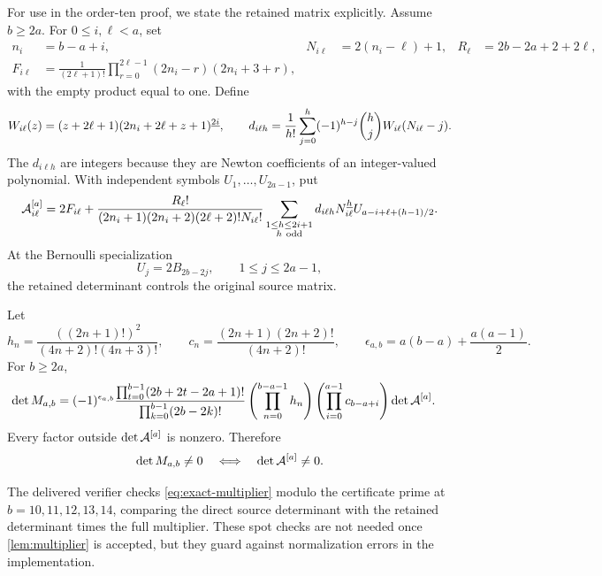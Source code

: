 For use in the order-ten proof, we state the retained matrix explicitly.
Assume $b\ge2a$.  For $0\le i,\ell<a$, set
\begin{align}
 n_i&=b-a+i,&
 N_{i\ell}&=2(n_i-\ell)+1,&
 R_\ell&=2b-2a+2+2\ell,\label{eq:retained-indices}\\
 F_{i\ell}&=\frac1{(2\ell+1)!}
 \prod_{r=0}^{2\ell-1}(2n_i-r)(2n_i+3+r),
 \label{eq:F-entry}
\end{align}
with the empty product equal to one.  Define
\begin{equation}
 W_{i\ell}(z)=(z+2\ell+1)
              (2n_i+2\ell+z+1)^{\underline{2i}},
 \qquad
 d_{i\ell h}=\frac1{h!}\sum_{j=0}^h
 (-1)^{h-j}\binom hjW_{i\ell}(N_{i\ell}-j).
 \label{eq:d-finite-difference}
\end{equation}
The $d_{i\ell h}$ are integers because they are Newton coefficients of
an integer-valued polynomial.  With independent symbols
$U_1,\ldots,U_{2a-1}$, put
\begin{equation}
 \mathcal{A}^{[a]}_{i\ell}
 =2F_{i\ell}
 +\frac{R_\ell!}
 {(2n_i+1)(2n_i+2)(2\ell+2)!N_{i\ell}!}
 \sum_{\substack{1\le h\le2i+1\\h\ {\rm odd}}}
 d_{i\ell h}N_{i\ell}^{\underline{h}}
 U_{a-i+\ell+(h-1)/2}.
 \label{eq:retained-A}
\end{equation}
At the Bernoulli specialization
\begin{equation}
 U_j=2B_{2b-2j},\qquad 1\le j\le2a-1,
 \label{eq:U-specialization}
\end{equation}
the retained determinant controls the original source matrix.

\begin{lemma}
\label{lem:multiplier}
Let
\[
 h_n=\frac{((2n+1)!)^2}{(4n+2)!(4n+3)!},
 \qquad
 c_n=\frac{(2n+1)(2n+2)!}{(4n+2)!},
 \qquad
 \epsilon_{a,b}=a(b-a)+\frac{a(a-1)}2.
\]
For $b\ge2a$,
\begin{align}
 \det M_{a,b}
 ={}&(-1)^{\epsilon_{a,b}}
 \frac{\prod_{t=0}^{b-1}(2b+2t-2a+1)!}
      {\prod_{k=0}^{b-1}(2b-2k)!}
 \left(\prod_{n=0}^{b-a-1}h_n\right)
 \left(\prod_{i=0}^{a-1}c_{b-a+i}\right)
 \det\mathcal{A}^{[a]}.
 \label{eq:exact-multiplier}
\end{align}
Every factor outside $\det\mathcal{A}^{[a]}$ is nonzero.  Therefore
\[
 \det M_{a,b}\ne0
 \quad\Longleftrightarrow\quad
 \det\mathcal{A}^{[a]}\ne0.
\]
\end{lemma}

The delivered verifier checks \eqref{eq:exact-multiplier} modulo the
certificate prime at $b=10,11,12,13,14$, comparing the direct source
determinant with the retained determinant times the full multiplier.
These spot checks are not needed once \cref{lem:multiplier} is accepted,
but they guard against normalization errors in the implementation.

